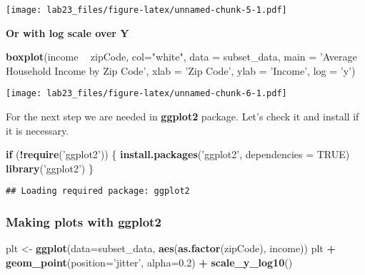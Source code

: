 \documentclass[
]{article}
\newenvironment{Shaded}{\begin{snugshade}}{\end{snugshade}}
\newcommand{\ControlFlowTok}[1]{\textcolor[rgb]{0.13,0.29,0.53}{\textbf{#1}}}
\newcommand{\DataTypeTok}[1]{\textcolor[rgb]{0.13,0.29,0.53}{#1}}
\newcommand{\FloatTok}[1]{\textcolor[rgb]{0.00,0.00,0.81}{#1}}
\newcommand{\KeywordTok}[1]{\textcolor[rgb]{0.13,0.29,0.53}{\textbf{#1}}}
\newcommand{\NormalTok}[1]{#1}
\newcommand{\OperatorTok}[1]{\textcolor[rgb]{0.81,0.36,0.00}{\textbf{#1}}}
\newcommand{\OtherTok}[1]{\textcolor[rgb]{0.56,0.35,0.01}{#1}}
\newcommand{\StringTok}[1]{\textcolor[rgb]{0.31,0.60,0.02}{#1}}
\begin{document}
\texttt{[image: lab23\_files/figure-latex/unnamed-chunk-5-1.pdf]}

\textbf{Or with log scale over Y}

\begin{Shaded}
\begin{Highlighting}[]
\KeywordTok{boxplot}\NormalTok{(income }\OperatorTok{~}\StringTok{ }\NormalTok{zipCode, }\DataTypeTok{col=}\StringTok{"white"}\NormalTok{, }\DataTypeTok{data =}\NormalTok{ subset_data, }\DataTypeTok{main =} \StringTok{'Average Household Income by Zip Code'}\NormalTok{, }\DataTypeTok{xlab =} \StringTok{'Zip Code'}\NormalTok{, }\DataTypeTok{ylab =} \StringTok{'Income'}\NormalTok{, }\DataTypeTok{log =} \StringTok{'y'}\NormalTok{)}
\end{Highlighting}
\end{Shaded}

\texttt{[image: lab23\_files/figure-latex/unnamed-chunk-6-1.pdf]}

For the next step we are needed in \textbf{ggplot2} package. Let's check
it and install if it is necessary.

\begin{Shaded}
\begin{Highlighting}[]
 \ControlFlowTok{if}\NormalTok{ (}\OperatorTok{!}\KeywordTok{require}\NormalTok{(}\StringTok{'ggplot2'}\NormalTok{))}
\NormalTok{   \{}
      \KeywordTok{install.packages}\NormalTok{(}\StringTok{'ggplot2'}\NormalTok{, }\DataTypeTok{dependencies =} \OtherTok{TRUE}\NormalTok{)}
      \KeywordTok{library}\NormalTok{(}\StringTok{'ggplot2'}\NormalTok{)}
\NormalTok{   \}}
\end{Highlighting}
\end{Shaded}

\begin{verbatim}
## Loading required package: ggplot2
\end{verbatim}

\hypertarget{making-plots-with-ggplot2}{%
\subsubsection{Making plots with
ggplot2}\label{making-plots-with-ggplot2}}

\begin{Shaded}
\begin{Highlighting}[]
\NormalTok{plt <-}\StringTok{ }\KeywordTok{ggplot}\NormalTok{(}\DataTypeTok{data=}\NormalTok{subset_data, }\KeywordTok{aes}\NormalTok{(}\KeywordTok{as.factor}\NormalTok{(zipCode), income))}
\NormalTok{plt }\OperatorTok{+}\StringTok{ }\KeywordTok{geom_point}\NormalTok{(}\DataTypeTok{position=}\StringTok{'jitter'}\NormalTok{, }\DataTypeTok{alpha=}\FloatTok{0.2}\NormalTok{) }\OperatorTok{+}\StringTok{ }\KeywordTok{scale_y_log10}\NormalTok{()}
\end{Highlighting}
\end{Shaded}
\end{document}
